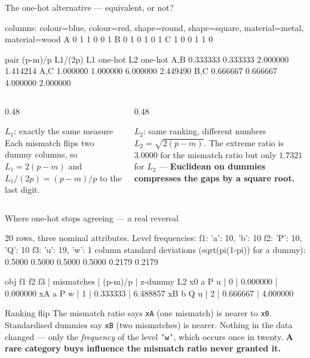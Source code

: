 \documentclass[aspectratio=169]{beamer}
\begin{document}
\begin{frame}[fragile,shrink=14]{The one-hot alternative --- equivalent, or not?}
\begin{outblk}
columns: colour=blue, colour=red, shape=round, shape=square, material=metal, material=wood
  A        0  1  1  0  0  1
  B        0  1  0  1  0  1
  C        1  0  0  1  1  0

pair        (p-m)/p      L1/(2p)   L1 one-hot   L2 one-hot
A,B        0.333333     0.333333     2.000000     1.414214
A,C        1.000000     1.000000     6.000000     2.449490
B,C        0.666667     0.666667     4.000000     2.000000
\end{outblk}
  \begin{columns}[T]
    \begin{column}{0.48\textwidth}
      \begin{block}{$L_1$: exactly the same measure}
        Each mismatch flips two dummy columns, so
        $L_1 = 2(p-m)$ and $L_1/(2p) = (p-m)/p$ to the last digit.
      \end{block}
    \end{column}
    \begin{column}{0.48\textwidth}
      \begin{alertblock}{$L_2$: same ranking, different numbers}
        $L_2 = \sqrt{2(p-m)}$. The extreme ratio is $3.0000$ for the
        mismatch ratio but only $1.7321$ for $L_2$ --- \textbf{Euclidean on
        dummies compresses the gaps by a square root.}
      \end{alertblock}
    \end{column}
  \end{columns}
\end{frame}

\begin{frame}[fragile,shrink=3]{Where one-hot stops agreeing --- a real reversal}
\begin{outblk}
20 rows, three nominal attributes.  Level frequencies:
  f1: {'a': 10, 'b': 10}    f2: {'P': 10, 'Q': 10}    f3: {'u': 19, 'w': 1}
column standard deviations (sqrt(pi(1-pi)) for a dummy):
  0.5000  0.5000  0.5000  0.5000  0.2179  0.2179

obj  f1   f2   f3   | mismatches |      (p-m)/p |     z-dummy L2
x0   a    P    u    |          0 |     0.000000 |       0.000000
xA   a    P    w    |          1 |     0.333333 |       6.488857
xB   b    Q    u    |          2 |     0.666667 |       4.000000
\end{outblk}
  \begin{alertblock}{Ranking flip}
    The mismatch ratio says \texttt{xA} (one mismatch) is nearer to
    \texttt{x0}. Standardised dummies say \texttt{xB} (two mismatches) is
    nearer. Nothing in the data changed --- only the \emph{frequency} of the
    level \texttt{'w'}, which occurs once in twenty. \textbf{A rare category
    buys influence the mismatch ratio never granted it.}
  \end{alertblock}
\end{frame}
\end{document}
